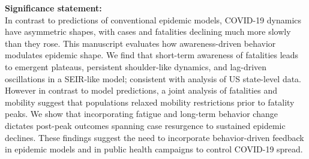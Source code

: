 \begin{boxit}
\noindent
\textbf{Significance statement:}\\
In contrast to predictions of conventional epidemic models,
COVID-19 dynamics have asymmetric shapes, with cases and fatalities
declining much more slowly than they rose.
This manuscript evaluates how awareness-driven
behavior modulates epidemic shape.
We find that short-term awareness of fatalities leads
to emergent plateaus, persistent shoulder-like dynamics, and lag-driven
oscillations in a SEIR-like model; consistent with analysis
of US state-level data.
However in contrast to model predictions, 
a joint analysis of fatalities and mobility suggest that
populations relaxed mobility restrictions prior to fatality peaks.
We show that incorporating fatigue and long-term behavior
change dictates post-peak outcomes spanning case resurgence
to sustained epidemic declines.
These findings suggest the need to incorporate
behavior-driven feedback in epidemic models and in public
health campaigns to control COVID-19 spread.
\end{boxit}
